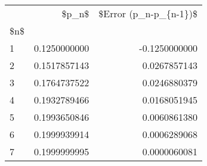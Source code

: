 \begin{tabular}{lrr}
\toprule
{} &         \$p\_n\$ &  \$Error (p\_n-p\_\{n-1\})\$ \\
\$n\$ &               &                        \\
\midrule
1   &  0.1250000000 &          -0.1250000000 \\
2   &  0.1517857143 &           0.0267857143 \\
3   &  0.1764737522 &           0.0246880379 \\
4   &  0.1932789466 &           0.0168051945 \\
5   &  0.1993650846 &           0.0060861380 \\
6   &  0.1999939914 &           0.0006289068 \\
7   &  0.1999999995 &           0.0000060081 \\
\bottomrule
\end{tabular}
